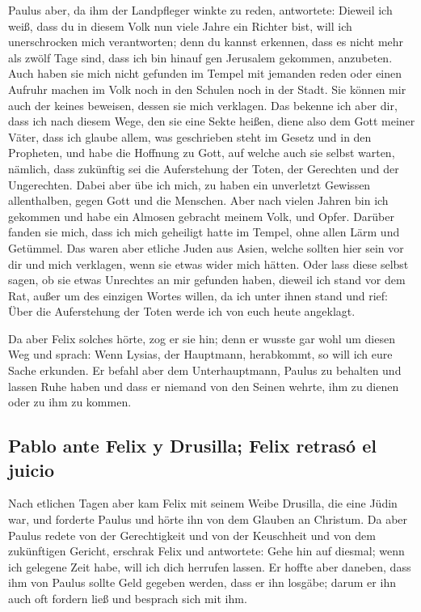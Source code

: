  Paulus aber, da ihm der Landpfleger winkte zu reden,
antwortete: Dieweil ich weiß, dass du in diesem Volk nun viele Jahre ein
Richter bist, will ich unerschrocken mich verantworten; 
denn du kannst erkennen, dass es nicht mehr als zwölf Tage sind, dass
ich bin hinauf gen Jerusalem gekommen, anzubeten.  Auch
haben sie mich nicht gefunden im Tempel mit jemanden reden oder einen
Aufruhr machen im Volk noch in den Schulen noch in der Stadt.
 Sie können mir auch der keines beweisen, dessen sie mich
verklagen.  Das bekenne ich aber dir, dass ich nach
diesem Wege, den sie eine Sekte heißen, diene also dem Gott meiner
Väter, dass ich glaube allem, was geschrieben steht im Gesetz und in den
Propheten,  und habe die Hoffnung zu Gott, auf welche
auch sie selbst warten, nämlich, dass zukünftig sei die Auferstehung der
Toten, der Gerechten und der Ungerechten.  Dabei aber übe
ich mich, zu haben ein unverletzt Gewissen allenthalben, gegen Gott und
die Menschen.  Aber nach vielen Jahren bin ich gekommen
und habe ein Almosen gebracht meinem Volk, und Opfer. 
Darüber fanden sie mich, dass ich mich geheiligt hatte im Tempel, ohne
allen Lärm und Getümmel.  Das waren aber etliche Juden
aus Asien, welche sollten hier sein vor dir und mich verklagen, wenn sie
etwas wider mich hätten.  Oder lass diese selbst sagen,
ob sie etwas Unrechtes an mir gefunden haben, dieweil ich stand vor dem
Rat,  außer um des einzigen Wortes willen, da ich unter
ihnen stand und rief: Über die Auferstehung der Toten werde ich von euch
heute angeklagt.

 Da aber Felix solches hörte, zog er sie hin; denn er
wusste gar wohl um diesen Weg und sprach: Wenn Lysias, der Hauptmann,
herabkommt, so will ich eure Sache erkunden.  Er befahl
aber dem Unterhauptmann, Paulus zu behalten und lassen Ruhe haben und
dass er niemand von den Seinen wehrte, ihm zu dienen oder zu ihm zu
kommen.

\hypertarget{pablo-ante-felix-y-drusilla-felix-retrasuxf3-el-juicio}{%
\subsection{Pablo ante Felix y Drusilla; Felix retrasó el
juicio}\label{pablo-ante-felix-y-drusilla-felix-retrasuxf3-el-juicio}}

 Nach etlichen Tagen aber kam Felix mit seinem Weibe
Drusilla, die eine Jüdin war, und forderte Paulus und hörte ihn von dem
Glauben an Christum.  Da aber Paulus redete von der
Gerechtigkeit und von der Keuschheit und von dem zukünftigen Gericht,
erschrak Felix und antwortete: Gehe hin auf diesmal; wenn ich gelegene
Zeit habe, will ich dich herrufen lassen.  Er hoffte aber
daneben, dass ihm von Paulus sollte Geld gegeben werden, dass er ihn
losgäbe; darum er ihn auch oft fordern ließ und besprach sich mit ihm.

